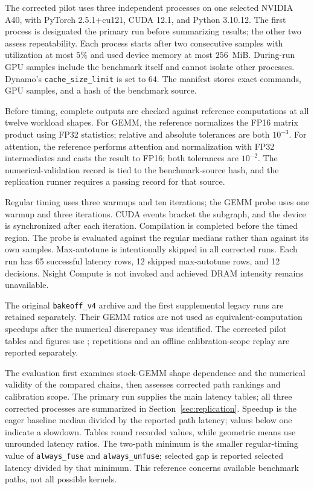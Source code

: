 \documentclass[a4paper,fleqn]{cas-dc}
\begin{document}
The corrected pilot uses three independent processes on one selected NVIDIA A40, with PyTorch 2.5.1+cu121, CUDA 12.1, and Python 3.10.12.
The first process is designated the primary run before summarizing results; the other two assess repeatability.
Each process starts after two consecutive samples with utilization at most $5\%$ and used device memory at most $256$~MiB.
During-run GPU samples include the benchmark itself and cannot isolate other processes.
Dynamo's \texttt{cache\_size\_limit} is set to $64$.
The manifest stores exact commands, GPU samples, and a hash of the benchmark source.

Before timing, complete outputs are checked against reference computations at all twelve workload shapes.
For GEMM, the reference normalizes the FP16 matrix product using FP32 statistics; relative and absolute tolerances are both $10^{-3}$.
For attention, the reference performs attention and normalization with FP32 intermediates and casts the result to FP16; both tolerances are $10^{-2}$.
The numerical-validation record is tied to the benchmark-source hash, and the replication runner requires a passing record for that source.

Regular timing uses three warmups and ten iterations; the GEMM probe uses one warmup and three iterations.
CUDA events bracket the subgraph, and the device is synchronized after each iteration.
Compilation is completed before the timed region.
The probe is evaluated against the regular medians rather than against its own samples.
Max-autotune is intentionally skipped in all corrected runs.
Each run has 65 successful latency rows, 12 skipped max-autotune rows, and 12 decisions.
Nsight Compute is not invoked and achieved DRAM intensity remains unavailable.

The original \texttt{bakeoff\_v4} archive and the first supplemental legacy runs are retained separately.
Their GEMM ratios are not used as equivalent-computation speedups after the numerical discrepancy was identified.
The corrected pilot tables and figures use ; repetitions and an offline calibration-scope replay are reported separately.


The evaluation first examines stock-GEMM shape dependence and the numerical validity of the compared chains, then assesses corrected path rankings and calibration scope.
The primary run supplies the main latency tables; all three corrected processes are summarized in Section~\ref{sec:replication}.
Speedup is the eager baseline median divided by the reported path latency; values below one indicate a slowdown.
Tables round recorded values, while geometric means use unrounded latency ratios.
The two-path minimum is the smaller regular-timing value of \texttt{always\_fuse} and \texttt{always\_unfuse}; selected gap is reported selected latency divided by that minimum.
This reference concerns available benchmark paths, not all possible kernels.
\end{document}
